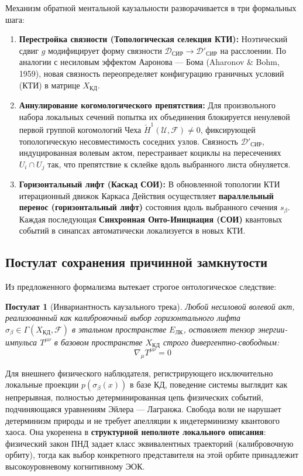 \documentclass[12pt,a4paper]{article}
\newtheorem{postulate}{Постулат}
\begin{document}
Механизм обратной ментальной каузальности разворачивается в три формальных шага:
\begin{enumerate}
    \item \textbf{Перестройка связности (Топологическая селекция КТИ):} Ноэтический сдвиг $g$ модифицирует форму связности $\mathcal{D}_{\text{СИР}} \to \mathcal{D}'_{\text{СИР}}$ на расслоении. По аналогии с несиловым эффектом Ааронова --- Бома (Aharonov \& Bohm, 1959), новая связность переопределяет конфигурацию граничных условий (КТИ) в матрице $X_{\text{КД}}$.
    \item \textbf{Аннулирование когомологического препятствия:} Для произвольного набора локальных сечений попытка их объединения блокируется ненулевой первой группой когомологий Чеха $\check{H}^1(\mathcal{U}, \mathcal{F}) \neq 0$, фиксирующей топологическую несовместимость соседних узлов. Связность $\mathcal{D}'_{\text{СИР}}$, индуцированная волевым актом, перестраивает коциклы на пересечениях $U_i \cap U_j$ так, что препятствие к склейке вдоль выбранного листа обнуляется.
    \item \textbf{Горизонтальный лифт (Каскад СОИ):} В обновленной топологии КТИ итерационный движок Каркаса Действия осуществляет \textbf{параллельный перенос (горизонтальный лифт)} состояния вдоль выбранного сечения $s_\beta$. Каждая последующая \textbf{Синхронная Онто-Инициация (СОИ)} квантовых событий в синапсах автоматически локализуется в новых КТИ.
\end{enumerate}

\subsection{Постулат сохранения причинной замкнутости}
Из предложенного формализма вытекает строгое онтологическое следствие:

\begin{postulate}[Инвариантность каузального трека]
Любой несиловой волевой акт, реализованный как калибровочный выбор горизонтального лифта $\sigma_\beta \in \Gamma(X_{\text{КД}}, \mathcal{F})$ в этальном пространстве $E_{\text{ЛК}}$, оставляет тензор энергии-импульса $T^{\mu\nu}$ в базовом пространстве $X_{\text{КД}}$ строго дивергентно-свободным:
\begin{equation}
\nabla_\mu T^{\mu\nu} = 0
\end{equation}
\end{postulate}

Для внешнего физического наблюдателя, регистрирующего исключительно локальные проекции $p(\sigma_\beta(x))$ в базе КД, поведение системы выглядит как непрерывная, полностью детерминированная цепь физических событий, подчиняющаяся уравнениям Эйлера --- Лагранжа. Свобода воли не нарушает детерминизм природы и не требует апелляции к индетерминизму квантового хаоса. Она укоренена в \textbf{структурной неполноте локального описания}: физический закон ПНД задает класс эквивалентных траекторий (калибровочную орбиту), тогда как выбор конкретного представителя на этой орбите принадлежит высокоуровневому когнитивному ЭОК.
\end{document}
